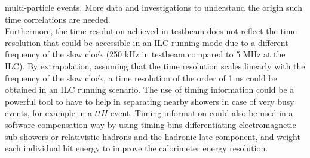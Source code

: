 multi-particle events. More data and investigations to understand the origin such time correlations are needed.\\[0.1cm]

Furthermore, the time resolution achieved in testbeam does not reflect the time resolution that could be accessible in an ILC running mode due to a different frequency of the slow clock (250 kHz in testbeam compared to 5 MHz at the ILC). By extrapolation, assuming that the time resolution scales linearly with the frequency of the slow clock, a time resolution of the order of 1 ns could be obtained in an ILC running scenario. The use of timing information could be a powerful tool to have to help in separating nearby showers in case of very busy events, for example in a $ttH$ event. Timing information could also be used in a software compensation way by using timing bins differentiating electromagnetic sub-showers or relativistic hadrons and the hadronic late component, and weight each individual hit energy to improve the calorimeter energy resolution.
